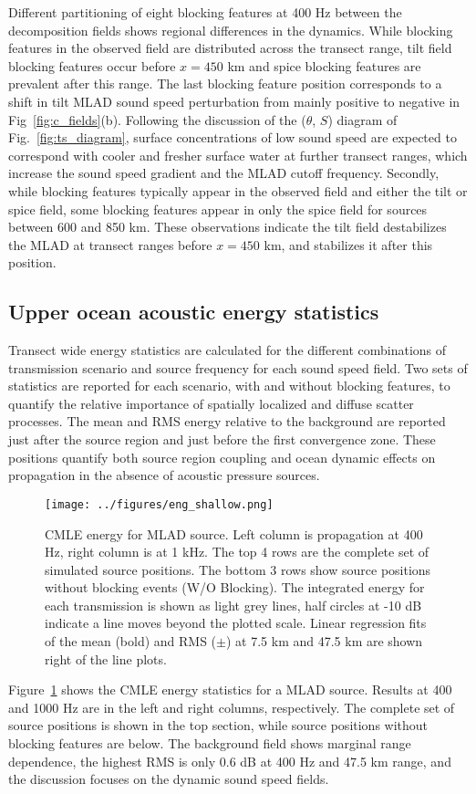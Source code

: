 \documentclass[preprint,NumberedRefs]{JASA}
\begin{document}
Different partitioning of eight blocking features at 400 Hz between the decomposition fields shows regional differences in the dynamics. While blocking features in the observed field are distributed across the transect range, tilt field blocking features occur before $x=450$ km and spice blocking features are prevalent after this range. The last blocking feature position corresponds to a shift in tilt MLAD sound speed perturbation from mainly positive to negative in Fig~\ref{fig:c_fields}(b). Following the discussion of the ($\theta$, $S$) diagram of Fig.~\ref{fig:ts_diagram}, surface concentrations of low sound speed are expected to correspond with cooler and fresher surface water at further transect ranges, which increase the sound speed gradient and the MLAD cutoff frequency. Secondly, while blocking features typically appear in the observed field and either the tilt or spice field, some blocking features appear in only the spice field for sources between 600 and 850 km. These observations indicate the tilt field destabilizes the MLAD at transect ranges before $x=450$ km, and stabilizes it after this position.

\subsection{Upper ocean acoustic energy statistics}\label{ssec:energy}
Transect wide energy statistics are calculated for the different combinations of transmission scenario and source frequency for each sound speed field. Two sets of statistics are reported for each scenario, with and without blocking features, to quantify the relative importance of spatially localized and diffuse scatter processes. The mean and RMS energy relative to the background are reported just after the source region and just before the first convergence zone. These positions quantify both source region coupling and ocean dynamic effects on propagation in the absence of acoustic pressure sources.

\begin{figure}
\texttt{[image: ../figures/eng\_shallow.png]}
    \caption{CMLE energy for MLAD source. Left column is propagation at 400 Hz, right column is at 1 kHz. The top 4 rows are the complete set of simulated source positions. The bottom 3 rows show source positions without blocking events (W/O Blocking). The integrated energy for each transmission is shown as light grey lines, half circles at -10 dB indicate a line moves beyond the plotted scale. Linear regression fits of the mean (bold) and RMS ($\pm$) at 7.5 km and 47.5 km are shown right of the line plots.}
    \label{fig:shal_eng}
\end{figure}
Figure~\ref{fig:shal_eng} shows the CMLE energy statistics for a MLAD source. Results at 400 and 1000 Hz are in the left and right columns, respectively. The complete set of source positions is shown in the top section, while source positions without blocking features are below. The background field shows marginal range dependence, the highest RMS is only 0.6 dB at 400 Hz and 47.5 km range, and the discussion focuses on the dynamic sound speed fields.
\end{document}
